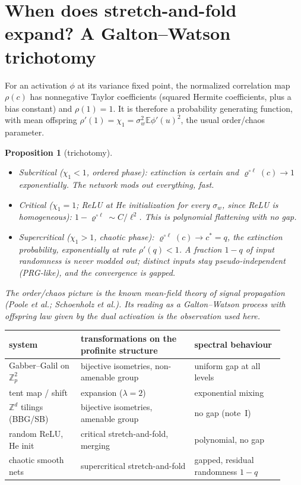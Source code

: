 \documentclass[11pt]{article}
\newtheorem{proposition}[theorem]{Proposition}
\theoremstyle{definition}
\theoremstyle{remark}
\newcommand{\Z}{\mathbb Z}
\newcommand{\E}{\mathbb E}
\begin{document}
\section{When does stretch-and-fold expand? A Galton--Watson trichotomy}

For an activation $\phi$ at its variance fixed point, the normalized correlation map $\rho(c)$ has nonnegative Taylor coefficients (squared Hermite coefficients, plus a bias constant) and $\rho(1)=1$. It is therefore a probability generating function, with mean offspring $\rho'(1)=\chi_1=\sigma_w^2\E\phi'(u)^2$, the usual order/chaos parameter.

\begin{proposition}[trichotomy]
\begin{itemize}
\item \emph{Subcritical} ($\chi_1<1$, ordered phase): extinction is certain and $\varrho^{\circ\ell}(c)\to1$ exponentially. The network mods out \emph{everything}, fast.
\item \emph{Critical} ($\chi_1=1$; ReLU at He initialization for every $\sigma_w$, since ReLU is homogeneous): $1-\varrho^{\circ\ell}\sim C/\ell^2$. This is polynomial flattening with no gap.
\item \emph{Supercritical} ($\chi_1>1$, chaotic phase): $\varrho^{\circ\ell}(c)\to c^*=q$, the extinction probability, exponentially at rate $\rho'(q)<1$. A fraction $1-q$ of input randomness is never modded out; distinct inputs stay pseudo-independent (PRG-like), and the convergence is gapped.
\end{itemize}
The order/chaos picture is the known mean-field theory of signal propagation (Poole et al.; Schoenholz et al.). Its reading as a Galton--Watson process with offspring law given by the dual activation is the observation used here.
\end{proposition}

\begin{center}\small
\begin{tabular}{p{0.24\linewidth}p{0.38\linewidth}p{0.3\linewidth}}
\toprule
system & transformations on the profinite structure & spectral behaviour\\
\midrule
Gabber--Galil on $\Z_p^2$ & bijective isometries, non-amenable group & uniform gap at all levels\\
tent map / shift & expansion ($\lambda=2$) & exponential mixing\\
$\Z^d$ tilings (BBG/SB) & bijective isometries, amenable group & no gap (note~I)\\
random ReLU, He init & critical stretch-and-fold, merging & polynomial, no gap\\
chaotic smooth nets & supercritical stretch-and-fold & gapped, residual randomness $1-q$\\
\bottomrule
\end{tabular}
\end{center}
\end{document}

